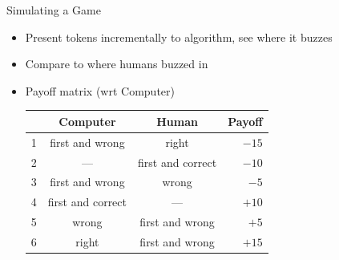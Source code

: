 \begin{frame}{Simulating a Game}
		\begin{itemize}
			\item Present tokens incrementally to algorithm, see where it buzzes
			\item Compare to where humans buzzed in
			\item Payoff matrix (wrt Computer)
			\begin{center}
\begin{tabular}{lccr}
& Computer & Human & Payoff \\
\hline
1 & first and wrong & right & $-15$ \\
2 & --- & first and correct & $-10$ \\
3  & first and wrong & wrong & $-5$ \\
4 & first and correct & --- & $+10$ \\
5 & wrong & first and wrong & $+5$ \\
6 & right & first and wrong & $+15$ \\
\hline
\end{tabular}
			\end{center}
		\end{itemize}
\end{frame}

\iflong

